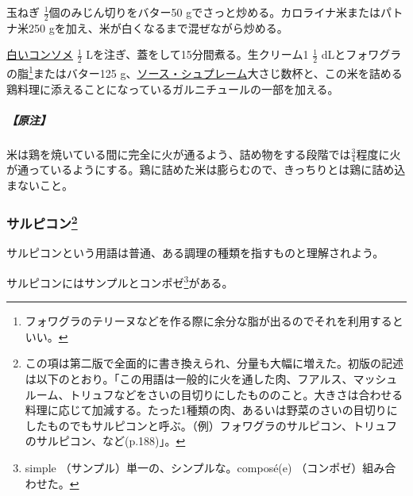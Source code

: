 \begin{recette}

玉ねぎ \(\frac{1}{2}\)個のみじん切りをバター50
gでさっと炒める。カロライナ米またはパトナ米250
gを加え、米が白くなるまで混ぜながら炒める。

\protect\hyperlink{consomme-blanc}{白いコンソメ} \(\frac{1}{2}\)
Lを注ぎ、蓋をして15分間煮る。生クリーム1 \(\frac{1}{2}\)
dLとフォワグラの脂\footnote{フォワグラのテリーヌなどを作る際に余分な脂が出るのでそれを利用するといい。}またはバター125
g、\protect\hyperlink{sauce-supreme}{ソース・シュプレーム}大さじ数杯と、この米を詰める鶏料理に添えることになっているガルニチュールの一部を加える。

\hypertarget{nota-riz-pour-farcir-les-volailles-servies-en-releve-ou-en-entree}{%
\subparagraph{【原注】}\label{nota-riz-pour-farcir-les-volailles-servies-en-releve-ou-en-entree}}

米は鶏を焼いている間に完全に火が通るよう、詰め物をする段階では\(\frac{3}{4}\)程度に火が通っているようにする。鶏に詰めた米は膨らむので、きっちりとは鶏に詰め込まないこと。

\atoaki{}

\hypertarget{salpicons-divers}{%
\subsubsection[サルピコン]{\texorpdfstring{サルピコン\footnote{この項は第二版で全面的に書き換えられ、分量も大幅に増えた。初版の記述は以下のとおり。「この用語は一般的に火を通した肉、フアルス、マッシュルーム、トリュフなどをさいの目切りにしたもののこと。大きさは合わせる料理に応じて加減する。たった1種類の肉、あるいは野菜のさいの目切りにしたものでもサルピコンと呼ぶ。（例）フォワグラのサルピコン、トリュフのサルピコン、など(p.188)」。}}{サルピコン}}\label{salpicons-divers}}


 

サルピコンという用語は普通、ある調理の種類を指すものと理解されよう。

サルピコンにはサンプルとコンポゼ\footnote{simple
  （サンプル）単一の、シンプルな。composé(e) （コンポゼ）組み合わせた。}がある。


\end{recette}
